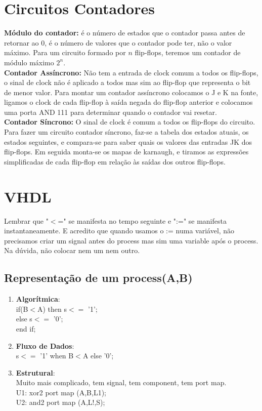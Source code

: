 \documentclass[•]{article}
\begin{document}
	\section{Circuitos Contadores}
		\textbf{Módulo do contador:} é o número de estados que o contador passa antes de retornar ao 0, é o número de valores que o contador pode ter, não o valor máximo. Para um circuito formado por $n$ flip-flops, teremos um contador de módulo máximo $2^n$.\\
		\textbf{Contador Assíncrono:} Não tem a entrada de clock comum a todos os flip-flops, o sinal de clock não é aplicado a todos mas sim ao flip-flop que representa o bit de menor valor. Para montar um contador assíncrono colocamos o J e K na fonte, ligamos o clock de cada flip-flop à saída negada do flip-flop anterior e colocamos uma porta AND 111 para determinar quando o contador vai resetar.\\
		\textbf{Contador Síncrono:} O sinal de clock é comum a todos os flip-flops do circuito. Para fazer um circuito contador síncrono, faz-se a tabela dos estados atuais, os estados seguintes, e compara-se para saber quais os valores das entradas JK dos flip-flops. Em seguida monta-se os mapas de karnaugh, e tiramos as expressões simplificadas de cada flip-flop em relação às saídas dos outros flip-flops.
	\section{VHDL}
		Lembrar que "$<$=" se manifesta no tempo seguinte e ":=" se manifesta instantaneamente. E acredito que quando usamos o := numa variável, não precisamos criar um signal antes do process mas sim uma variable após o process. Na dúvida, não colocar nem um nem outro.\\
		\subsection{Representação de um process(A,B)}
			\begin{enumerate}
				\item \textbf{Algorítmica}:\\
					if(B$<$A) then s$<=$ '1';\\
					else s$<=$ '0';\\
					end if;
				
				\item \textbf{Fluxo de Dados}:\\
					s$<=$ '1' when B$<$A else '0';
				
				\item \textbf{Estrutural}:\\
					Muito mais complicado, tem signal, tem component, tem port map.\\
					U1: xor2 port map (A,B,L1);\\
					U2: and2 port map (A,L!,S);
			\end{enumerate}
\end{document}
